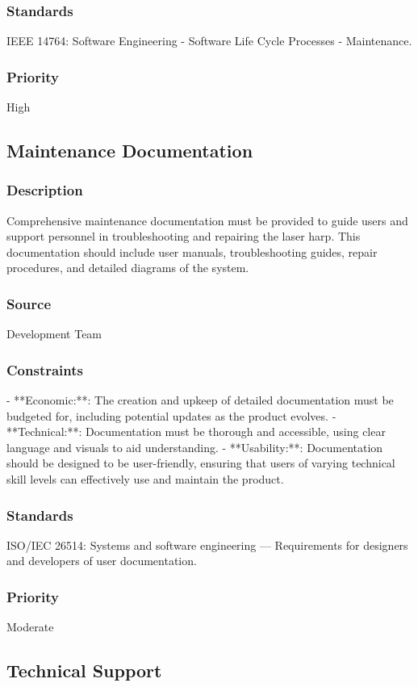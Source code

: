 \subsubsection{Standards}
IEEE 14764: Software Engineering - Software Life Cycle Processes - Maintenance.
\subsubsection{Priority}
High


\subsection{Maintenance Documentation}
\subsubsection{Description}
Comprehensive maintenance documentation must be provided to guide users and support personnel in troubleshooting and repairing the laser harp. This documentation should include user manuals, troubleshooting guides, repair procedures, and detailed diagrams of the system.
\subsubsection{Source}
Development Team
\subsubsection{Constraints}
- **Economic:**: The creation and upkeep of detailed documentation must be budgeted for, including potential updates as the product evolves.
- **Technical:**: Documentation must be thorough and accessible, using clear language and visuals to aid understanding.
- **Usability:**: Documentation should be designed to be user-friendly, ensuring that users of varying technical skill levels can effectively use and maintain the product.
\subsubsection{Standards}
ISO/IEC 26514: Systems and software engineering — Requirements for designers and developers of user documentation.
\subsubsection{Priority}
Moderate


\subsection{Technical Support}
